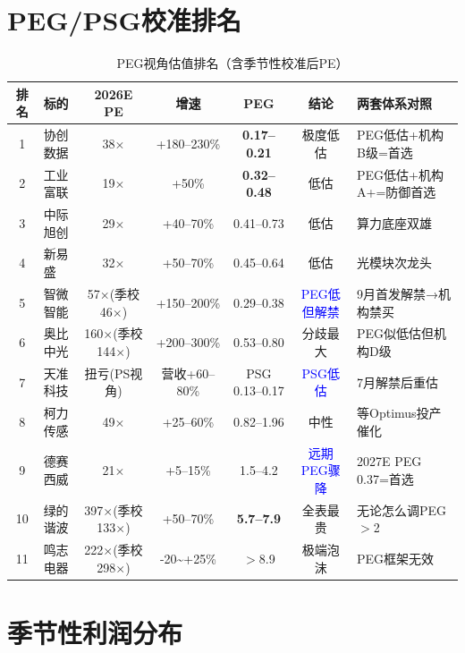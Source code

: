 \section{PEG/PSG校准排名}

\begin{table}[H]
\centering\scriptsize
\renewcommand{\arraystretch}{1.1}
\begin{tabularx}{\textwidth}{c l c c c c l}
\toprule
\textbf{排名} & \textbf{标的} & \textbf{2026E PE} & \textbf{增速} & \textbf{PEG} & \textbf{结论} & \textbf{两套体系对照} \\
\midrule
1 & 协创数据 & 38$\times$ & +180--230\% & \textbf{0.17--0.21} & \textcolor{riskgreen}{极度低估} & PEG低估+机构B级=首选 \\
2 & 工业富联 & 19$\times$ & +50\% & \textbf{0.32--0.48} & \textcolor{riskgreen}{低估} & PEG低估+机构A+=防御首选 \\
3 & 中际旭创 & 29$\times$ & +40--70\% & 0.41--0.73 & \textcolor{riskgreen}{低估} & 算力底座双雄 \\
4 & 新易盛 & 32$\times$ & +50--70\% & 0.45--0.64 & \textcolor{riskgreen}{低估} & 光模块次龙头 \\
5 & 智微智能 & 57$\times$(季校46$\times$) & +150--200\% & 0.29--0.38 & \textcolor{blue}{PEG低但解禁} & 9月首发解禁→机构禁买 \\
6 & 奥比中光 & 160$\times$(季校144$\times$) & +200--300\% & 0.53--0.80 & \textcolor{riskamber}{分歧最大} & PEG似低估但机构D级 \\
7 & 天准科技 & 扭亏(PS视角) & 营收+60--80\% & PSG 0.13--0.17 & \textcolor{blue}{PSG低估} & 7月解禁后重估 \\
8 & 柯力传感 & 49$\times$ & +25--60\% & 0.82--1.96 & 中性 & 等Optimus投产催化 \\
9 & 德赛西威 & 21$\times$ & +5--15\% & 1.5--4.2 & \textcolor{blue}{远期PEG骤降} & 2027E PEG 0.37=首选 \\
10 & 绿的谐波 & 397$\times$(季校133$\times$) & +50--70\% & \textbf{5.7--7.9} & \textcolor{riskred}{全表最贵} & 无论怎么调PEG$>$2 \\
11 & 鸣志电器 & 222$\times$(季校298$\times$) & -20\textasciitilde+25\% & $>$8.9 & \textcolor{riskred}{极端泡沫} & PEG框架无效 \\
\bottomrule
\end{tabularx}
\caption{PEG视角估值排名（含季节性校准后PE）}
\end{table}

\section{季节性利润分布}

